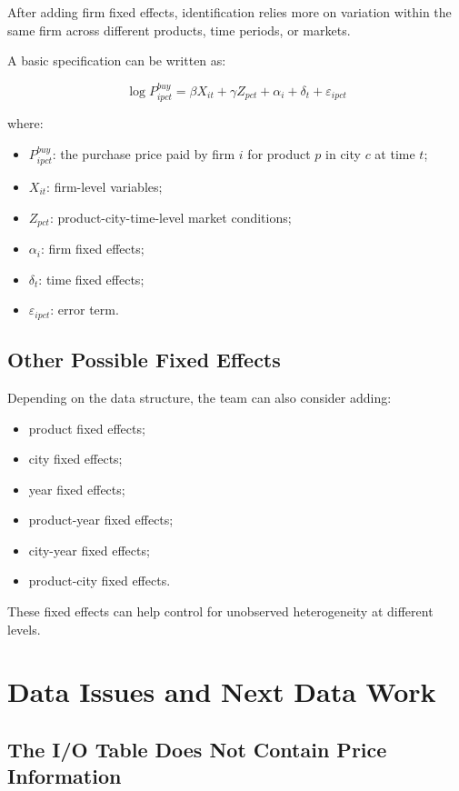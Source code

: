 \documentclass[11pt,a4paper]{article}
\begin{document}
After adding firm fixed effects, identification relies more on variation within the same firm across different products, time periods, or markets.

A basic specification can be written as:

\[
\log P^{buy}_{i p c t}
=
\beta X_{i t}
+
\gamma Z_{p c t}
+
\alpha_i
+
\delta_t
+
\varepsilon_{i p c t}
\]

where:

\begin{itemize}
    \item \(P^{buy}_{i p c t}\): the purchase price paid by firm \(i\) for product \(p\) in city \(c\) at time \(t\);
    \item \(X_{it}\): firm-level variables;
    \item \(Z_{pct}\): product-city-time-level market conditions;
    \item \(\alpha_i\): firm fixed effects;
    \item \(\delta_t\): time fixed effects;
    \item \(\varepsilon_{ipct}\): error term.
\end{itemize}

\subsection{Other Possible Fixed Effects}

Depending on the data structure, the team can also consider adding:

\begin{itemize}
    \item product fixed effects;
    \item city fixed effects;
    \item year fixed effects;
    \item product-year fixed effects;
    \item city-year fixed effects;
    \item product-city fixed effects.
\end{itemize}

These fixed effects can help control for unobserved heterogeneity at different levels.

\section{Data Issues and Next Data Work}

\subsection{The I/O Table Does Not Contain Price Information}
\end{document}
